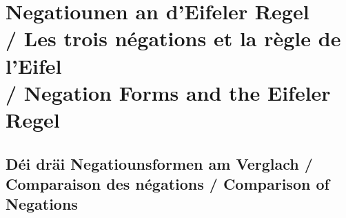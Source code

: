 \vspace{1.5em}

\section[Negatiounen an d'Eifeler Regel / Negation and the Eifeler Regel]{Negatiounen an d'Eifeler Regel \\/ Les trois négations et la règle de l'Eifel \\/ Negation Forms and the Eifeler Regel}

\subsection{Déi dräi Negatiounsformen am Verglach / Comparaison des négations / Comparison of Negations}

